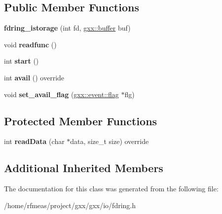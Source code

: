 \subsection*{Public Member Functions}
\begin{DoxyCompactItemize}
\item 
{\bfseries fdring\+\_\+istorage} (int fd, \hyperlink{classgxx_1_1buffer}{gxx\+::buffer} buf)\hypertarget{classgxx_1_1io_1_1fdring__istorage_a5b1f39549243b8bee41b58d8e09d159a}{}\label{classgxx_1_1io_1_1fdring__istorage_a5b1f39549243b8bee41b58d8e09d159a}

\item 
void {\bfseries readfunc} ()\hypertarget{classgxx_1_1io_1_1fdring__istorage_aee701c0dcf18efa358f8e1bece2c00d3}{}\label{classgxx_1_1io_1_1fdring__istorage_aee701c0dcf18efa358f8e1bece2c00d3}

\item 
int {\bfseries start} ()\hypertarget{classgxx_1_1io_1_1fdring__istorage_a0a09501fd3da0cb016e69d6af04142a5}{}\label{classgxx_1_1io_1_1fdring__istorage_a0a09501fd3da0cb016e69d6af04142a5}

\item 
int {\bfseries avail} () override\hypertarget{classgxx_1_1io_1_1fdring__istorage_aba9f24c5f3dc8c42ce75da8cf66d4f30}{}\label{classgxx_1_1io_1_1fdring__istorage_aba9f24c5f3dc8c42ce75da8cf66d4f30}

\item 
void {\bfseries set\+\_\+avail\+\_\+flag} (\hyperlink{classgxx_1_1event_1_1flag}{gxx\+::event\+::flag} $\ast$flg)\hypertarget{classgxx_1_1io_1_1fdring__istorage_a0b7fe9e4d05a159c83a4d028652ab31f}{}\label{classgxx_1_1io_1_1fdring__istorage_a0b7fe9e4d05a159c83a4d028652ab31f}

\end{DoxyCompactItemize}
\subsection*{Protected Member Functions}
\begin{DoxyCompactItemize}
\item 
int {\bfseries read\+Data} (char $\ast$data, size\+\_\+t size) override\hypertarget{classgxx_1_1io_1_1fdring__istorage_ae1dea4c50c0a451d8db1b24a91544a27}{}\label{classgxx_1_1io_1_1fdring__istorage_ae1dea4c50c0a451d8db1b24a91544a27}

\end{DoxyCompactItemize}
\subsection*{Additional Inherited Members}


The documentation for this class was generated from the following file\+:\begin{DoxyCompactItemize}
\item 
/home/rfmeas/project/gxx/gxx/io/fdring.\+h\end{DoxyCompactItemize}
